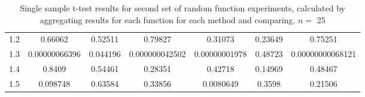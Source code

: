 \documentclass[a4paper,11pt]{article}
\begin{document}
\begin{appendices}
\begin{table}[htb]
\begin{center}
{\begin{tabular}{r|cccccc}
      1.2  &              0.66062  &   0.52511  &               0.79827  &              0.31073  &   0.23649  &                 0.75251  \\
      1.3  &  \num{0.00000066396}  &  0.044196  &  \num{0.000000042502}  &  \num{0.00000001978}  &   0.48723  &  \num{0.00000000068121}  \\
      1.4  &               0.8409  &   0.54461  &               0.28351  &              0.42718  &   0.14969  &                 0.48467  \\
      1.5  &             0.098748  &   0.63584  &               0.33856  &            0.0080649  &    0.3598  &                 0.21506  \\
\end{tabular}
}
\end{center}
\caption{Single sample t-test results for second set of random function experiments, calculated by aggregating results for each function for each method and comparing. $n=$ 25} \end{table}

\end{appendices}
\end{document}
